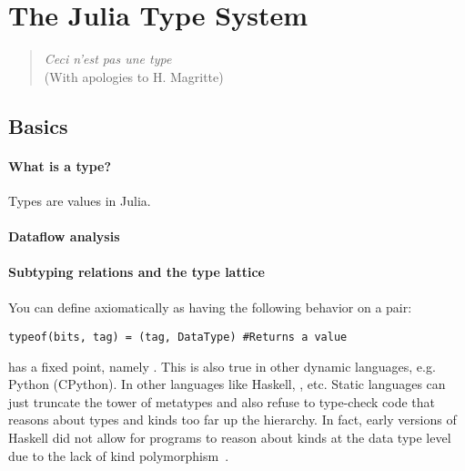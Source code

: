 \section{The Julia Type System}

\begin{quote}
  \textit{Ceci n'est pas une type} \\
  (With apologies to H. Magritte)
\end{quote}

\subsection{Basics}

\paragraph{What is a type?}
Types are values in Julia.

\paragraph{Dataflow analysis}

\paragraph{Subtyping relations and the type lattice}

\paragraph{}

You can define  axiomatically as having the following behavior on a  pair:

\begin{verbatim}
typeof(bits, tag) = (tag, DataType) #Returns a value
\end{verbatim}

 has a fixed point, namely . This is also true in other dynamic languages, e.g. Python (CPython). In other languages like Haskell, , etc. Static languages can just truncate the tower of metatypes and also refuse to type-check code that reasons about types and kinds too far up the hierarchy. In fact, early versions of Haskell did not allow for programs to reason about kinds at the data type level due to the lack of kind polymorphism~\cite{haskellkindtypes}.

